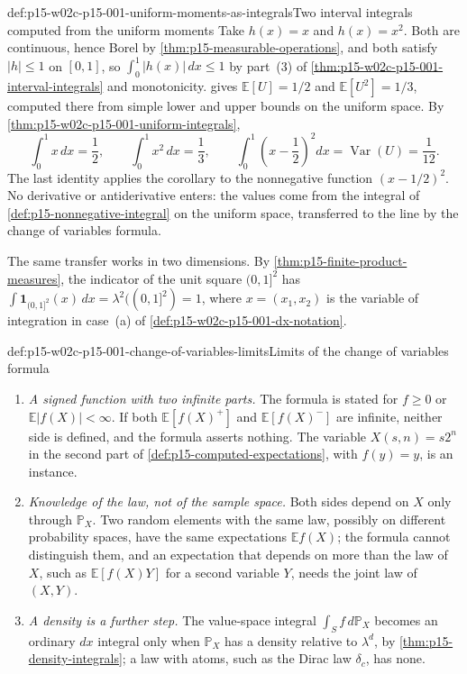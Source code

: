 \begin{hbexample}{def:p15-w02c-p15-001-uniform-moments-as-integrals}{Two interval integrals computed from the uniform moments}
Take \(h(x)=x\) and \(h(x)=x^2\). Both are continuous, hence Borel by
\cref{thm:p15-measurable-operations}, and both satisfy \(|h|\leq1\) on
\([0,1]\), so \(\int_0^1|h(x)|\,dx\leq1\) by part~(3) of
\cref{thm:p15-w02c-p15-001-interval-integrals} and monotonicity.
 gives \(\mathbb E[U]=1/2\)
and \(\mathbb E[U^2]=1/3\), computed there from simple lower and upper
bounds on the uniform space. By
\cref{thm:p15-w02c-p15-001-uniform-integrals},
\[
 \int_0^1x\,dx=\frac12,\qquad\int_0^1x^2\,dx=\frac13,\qquad
 \int_0^1\left(x-\frac12\right)^2dx=\operatorname{Var}(U)=\frac1{12}.
\]
The last identity applies the corollary to the nonnegative function
\((x-1/2)^2\). No derivative or antiderivative enters: the
values come from the integral of
\cref{def:p15-nonnegative-integral} on the uniform space, transferred to
the line by the change of variables formula.

The same transfer works in two dimensions. By
\cref{thm:p15-finite-product-measures}, the indicator of the unit square
\((0,1]^2\) has \(\int\mathbf1_{(0,1]^2}(x)\,dx=\lambda^2((0,1]^2)=1\),
where \(x=(x_1,x_2)\) is the variable of integration in
case~(a) of \cref{def:p15-w02c-p15-001-dx-notation}.
\end{hbexample}

\begin{hbwarning}{def:p15-w02c-p15-001-change-of-variables-limits}{Limits of the change of variables formula}
\par\nobreak
\begin{enumerate}
\item \emph{A signed function with two infinite parts.} The formula is
      stated for \(f\geq0\) or \(\mathbb E|f(X)|<\infty\). If both
      \(\mathbb E[f(X)^+]\) and \(\mathbb E[f(X)^-]\) are infinite,
      neither side is defined, and the formula asserts nothing. The
      variable \(X(s,n)=s2^n\) in the second part of
      \cref{def:p15-computed-expectations}, with \(f(y)=y\), is an
      instance.
\item \emph{Knowledge of the law, not of the sample space.} Both sides
      depend on \(X\) only through \(\mathbb P_X\). Two random elements
      with the same law, possibly on different probability spaces, have
      the same expectations \(\mathbb E f(X)\); the formula cannot
      distinguish them, and an expectation that depends on more than the
      law of \(X\), such as \(\mathbb E[f(X)Y]\) for a second variable
      \(Y\), needs the joint law of \((X,Y)\).
\item \emph{A density is a further step.} The value-space integral
      \(\int_S f\,d\mathbb P_X\) becomes an ordinary \(dx\) integral only
      when \(\mathbb P_X\) has a density relative to \(\lambda^d\), by
      \cref{thm:p15-density-integrals}; a law with atoms, such as the
      Dirac law \(\delta_c\), has none.
\end{enumerate}
\end{hbwarning}


